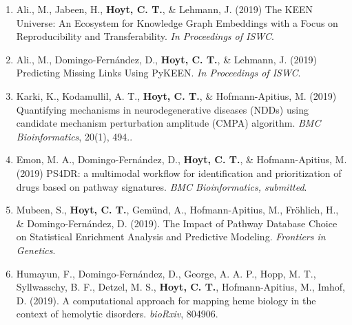 \begin{enumerate}
    \item Ali., M., Jabeen, H., \textbf{Hoyt, C. T.}, \& Lehmann, J. (2019) The KEEN Universe: An Ecosystem for Knowledge Graph Embeddings with a Focus on Reproducibility and Transferability. \textit{In Proceedings of ISWC}.
    \item Ali., M., Domingo-Fern\'{a}ndez, D., \textbf{Hoyt, C. T.}, \& Lehmann, J. (2019) Predicting Missing Links Using PyKEEN. \textit{In Proceedings of ISWC}.
    \item Karki, K., Kodamullil, A. T., \textbf{Hoyt, C. T.}, \& Hofmann-Apitius, M. (2019) Quantifying mechanisms in neurodegenerative diseases (NDDs) using candidate mechanism perturbation amplitude (CMPA) algorithm. \textit{BMC Bioinformatics}, 20(1), 494..
    \item Emon, M. A., Domingo-Fern\'{a}ndez, D., \textbf{Hoyt, C. T.}, \& Hofmann-Apitius, M. (2019) PS4DR: a multimodal workflow for identification and prioritization of drugs based on pathway signatures. \textit{BMC Bioinformatics, submitted}.
    \item Mubeen, S., \textbf{Hoyt, C. T.}, Gem\"{u}nd, A., Hofmann-Apitius, M., Fr\"{o}hlich, H., \& Domingo-Fern\'{a}ndez, D. (2019). The Impact of Pathway Database Choice on Statistical Enrichment Analysis and Predictive Modeling. \textit{Frontiers in Genetics}.
    \item Humayun, F., Domingo-Fernández, D., George, A. A. P., Hopp, M. T., Syllwasschy, B. F., Detzel, M. S., \textbf{Hoyt, C. T.}, Hofmann-Apitius, M., Imhof, D. (2019). A computational approach for mapping heme biology in the context of hemolytic disorders. \textit{bioRxiv}, 804906.
\end{enumerate}
